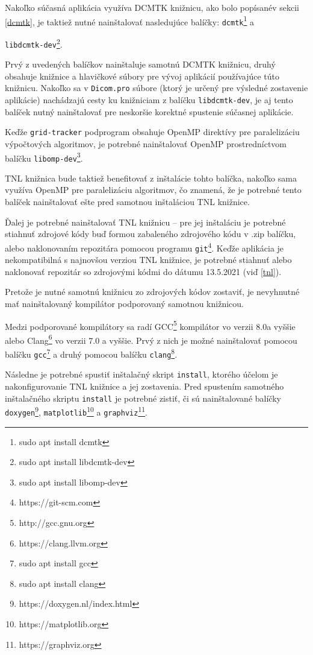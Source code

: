 Nakoľko súčasná aplikácia využíva DCMTK knižnicu, ako bolo popísané\newline v sekcii \ref{dcmtk}, je taktiež nutné nainštalovať nasledujúce balíčky: \texttt{dcmtk}\footnote{sudo apt install dcmtk} \newline a {\texttt{libdcmtk-dev}\footnote{sudo apt install libdcmtk-dev}.

Prvý z uvedených balíčkov nainštaluje samotnú DCMTK knižnicu, druhý obsahuje knižnice a hlavičkové súbory pre vývoj aplikácií používajúce túto knižnicu. Nakoľko sa v \texttt{Dicom.pro} súbore (ktorý je určený pre výsledné zostavenie aplikácie) nachádzajú cesty ku knižniciam z balíčku \texttt{libdcmtk-dev}, je aj tento balíček nutný nainštalovať pre neskoršie korektné spustenie súčasnej aplikácie.

Keďže \texttt{grid-tracker} podprogram obsahuje OpenMP direktívy pre paralelizáciu výpočtových algoritmov, je potrebné nainštalovať OpenMP prostredníctvom balíčku \texttt{libomp-dev}\footnote{sudo apt install libomp-dev}.

\clearpage
TNL knižnica bude taktiež benefitovať z inštalácie tohto balíčka, nakoľko sama využíva OpenMP pre paralelizáciu algoritmov, čo znamená, že je potrebné tento balíček nainštalovať ešte pred samotnou inštaláciou TNL knižnice.

Ďalej je potrebné nainštalovať TNL knižnicu -- pre jej inštaláciu je potrebné stiahnuť zdrojové kódy buď formou zabaleného zdrojového kódu v .zip balíčku, alebo naklonovaním repozitára pomocou programu \texttt{git}\footnote{https://git-scm.com}. Keďže aplikácia je nekompatibilná s najnovšou verziou TNL knižnice, je potrebné stiahnuť alebo naklonovať repozitár so zdrojovými kódmi do dátumu 13.5.2021 (viď \ref{tnl}).

Pretože je nutné samotnú knižnicu zo zdrojových kódov zostaviť, je nevyhnutné mať nainštalovaný kompilátor podporovaný samotnou knižnicou.

Medzi podporované kompilátory sa radí GCC\footnote{http://gcc.gnu.org} kompilátor vo verzii 8.0\newline a vyššie alebo Clang\footnote{https://clang.llvm.org} vo verzii 7.0 a vyššie. Prvý z nich je možné nainštalovať pomocou balíčku \texttt{gcc}\footnote{sudo apt install gcc} a druhý pomocou balíčku \texttt{clang}\footnote{sudo apt install clang}.

Následne je potrebné spustiť inštalačný skript \texttt{install}, ktorého účelom je nakonfigurovanie TNL knižnice a jej zostavenia.
Pred spustením samotného inštalačného skriptu \texttt{install} je potrebné zistiť, či sú nainštalované balíčky \texttt{doxygen}\footnote{https://doxygen.nl/index.html}, \texttt{matplotlib}\footnote{https://matplotlib.org} a \texttt{graphviz}\footnote{https://graphviz.org}.

}
